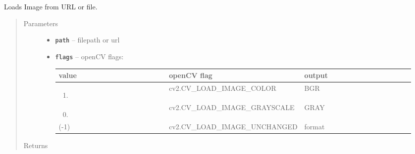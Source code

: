 \documentclass[letterpaper,10pt,english]{sphinxmanual}
\begin{document}

\begin{fulllineitems}
\label{RRtoolbox.lib:RRtoolbox.lib.image.loadsfrom}
Loads Image from URL or file.
\begin{quote}\begin{description}
\item[{Parameters}] \leavevmode\begin{itemize}
\item {} 
\textbf{\texttt{path}} -- filepath or url

\item {} 
\textbf{\texttt{flags}} -- 
openCV flags:

\begin{tabular}{|p{0.317\linewidth}|p{0.317\linewidth}|p{0.317\linewidth}|}
\hline
\textsf{\relax 
value
} & \textsf{\relax 
openCV flag
} & \textsf{\relax 
output
}\\
\hline\begin{enumerate}
\item {} 
\end{enumerate}
 & 
cv2.CV\_LOAD\_IMAGE\_COLOR
 & 
BGR
\\
\hline\begin{enumerate}
\setcounter{enumi}{-1}
\item {} 
\end{enumerate}
 & 
cv2.CV\_LOAD\_IMAGE\_GRAYSCALE
 & 
GRAY
\\
\hline
(-1)
 & 
cv2.CV\_LOAD\_IMAGE\_UNCHANGED
 & 
format
\\
\hline\end{tabular}



\end{itemize}

\item[{Returns}] \leavevmode


\end{description}\end{quote}

\end{fulllineitems}

\end{document}
